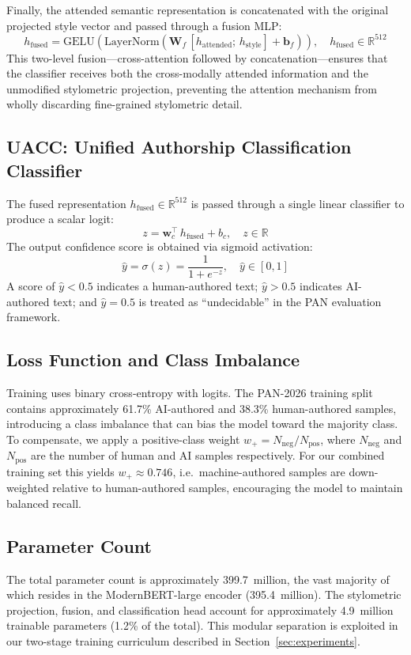 Finally, the attended semantic representation is concatenated with the original
projected style vector and passed through a fusion MLP:
\begin{equation}
  h_\text{fused} = \mathrm{GELU}(\mathrm{LayerNorm}(\mathbf{W}_f\, [h_\text{attended};\, h_\text{style}] + \mathbf{b}_f)),
  \quad h_\text{fused} \in \mathbb{R}^{512}
\end{equation}
This two-level fusion—cross-attention followed by concatenation—ensures that the classifier
receives both the cross-modally attended information and the unmodified stylometric projection,
preventing the attention mechanism from wholly discarding fine-grained stylometric detail.

\subsection{UACC: Unified Authorship Classification Classifier}

The fused representation $h_\text{fused} \in \mathbb{R}^{512}$ is passed through a single
linear classifier to produce a scalar logit:
\begin{equation}
  z = \mathbf{w}_c^\top\, h_\text{fused} + b_c, \quad z \in \mathbb{R}
\end{equation}
The output confidence score is obtained via sigmoid activation:
\begin{equation}
  \hat{y} = \sigma(z) = \frac{1}{1 + e^{-z}}, \quad \hat{y} \in [0, 1]
\end{equation}
A score of $\hat{y} < 0.5$ indicates a human-authored text; $\hat{y} > 0.5$ indicates
AI-authored text; and $\hat{y} = 0.5$ is treated as ``undecidable'' in the PAN evaluation
framework.

\subsection{Loss Function and Class Imbalance}

Training uses binary cross-entropy with logits. The PAN-2026 training split contains
approximately 61.7\% AI-authored and 38.3\% human-authored samples, introducing a
class imbalance that can bias the model toward the majority class. To compensate, we
apply a positive-class weight $w_+ = N_\text{neg} / N_\text{pos}$, where
$N_\text{neg}$ and $N_\text{pos}$ are the number of human and AI samples respectively.
For our combined training set this yields $w_+ \approx 0.746$, i.e.~machine-authored
samples are down-weighted relative to human-authored samples, encouraging the model
to maintain balanced recall.

\subsection{Parameter Count}

The total parameter count is approximately 399.7~million, the vast majority of which
resides in the ModernBERT-large encoder (395.4~million). The stylometric projection,
fusion, and classification head account for approximately 4.9~million trainable parameters
(1.2\% of the total). This modular separation is exploited in our two-stage training
curriculum described in Section~\ref{sec:experiments}.
